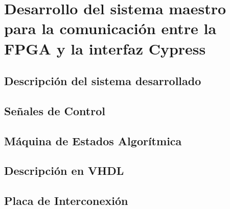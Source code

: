\chapter{Desarrollo del sistema maestro para la comunicación entre la FPGA y la interfaz Cypress}
	\section{Descripción del sistema desarrollado}
		
	\section{Señales de Control}
		
	\section{Máquina de Estados Algorítmica}
		
	\section{Descripción en VHDL}
		
	\section{Placa de Interconexión}
		